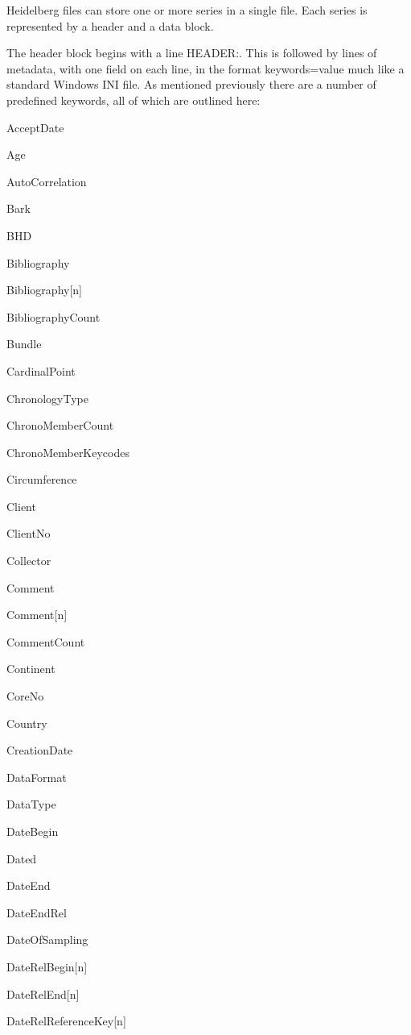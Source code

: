 \documentclass[10pt, headsepline,DIV14,BCOR0.5cm]{scrreprt}
\begin{document}
Heidelberg files can store one or more series in a single file. Each series is represented by a header and a data block.

The header block begins with a line HEADER:. This is followed by lines of metadata, with one field on each line, in the format keywords=value much like a standard Windows INI file. As mentioned previously there are a number of predefined keywords, all of which are outlined here:

\begin{multicols}{2}
\begin{itemize*}
 \item  AcceptDate
 \item  Age
 \item  AutoCorrelation
 \item  Bark
 \item  BHD
 \item  Bibliography
 \item  Bibliography[n]
 \item  BibliographyCount
 \item  Bundle
 \item  CardinalPoint
 \item  ChronologyType
 \item  ChronoMemberCount
 \item  ChronoMemberKeycodes
 \item  Circumference
 \item  Client
 \item  ClientNo
 \item  Collector
 \item  Comment
 \item  Comment[n]
 \item  CommentCount
 \item  Continent
 \item  CoreNo
 \item  Country
 \item  CreationDate
 \item  DataFormat
 \item  DataType
 \item  DateBegin
 \item  Dated
 \item  DateEnd
 \item  DateEndRel
 \item  DateOfSampling
 \item  DateRelBegin[n]
 \item  DateRelEnd[n]
 \item  DateRelReferenceKey[n]

\end{itemize*}
\end{multicols}
\end{document}
